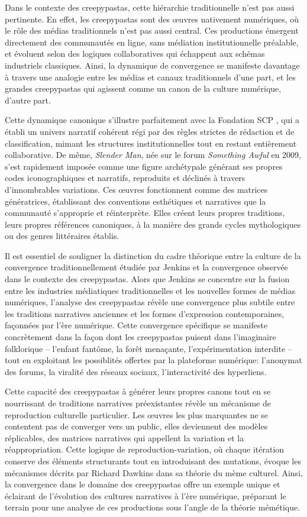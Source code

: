 \documentclass[12pt,a4paper,oneside,titlepage]{book} %
\begin{document}
Dans le contexte des creepypastas, cette hiérarchie traditionnelle n'est pas aussi pertinente. En effet, les creepypastas sont des œuvres nativement numériques, où le rôle des médias traditionnels n'est pas aussi central. Ces productions émergent directement des communautés en ligne, sans médiation institutionnelle préalable, et évoluent selon des logiques collaboratives qui échappent aux schémas industriels classiques. Ainsi, la dynamique de convergence se manifeste davantage à travers une analogie entre les médias et canaux traditionnels d'une part, et les grandes creepypastas qui agissent comme un canon de la culture numérique, d'autre part.

Cette dynamique canonique s'illustre parfaitement avec la Fondation SCP , qui a établi un univers narratif cohérent régi par des règles strictes de rédaction et de classification, mimant les structures institutionnelles tout en restant entièrement collaborative. De même, \textit{Slender Man}, née sur le forum \textit{Something Awful }en 2009, s'est rapidement imposée comme une figure archétypale générant ses propres codes iconographiques et narratifs, reproduits et déclinés à travers d'innombrables variations. Ces œuvres fonctionnent comme des matrices génératrices, établissant des conventions esthétiques et narratives que la communauté s'approprie et réinterprète. Elles créent leurs propres traditions, leurs propres références canoniques, à la manière des grands cycles mythologiques ou des genres littéraires établis.

Il est essentiel de souligner la distinction du cadre théorique entre la culture de la convergence traditionnellement étudiée par Jenkins et la convergence observée dans le contexte des creepypastas. Alors que Jenkins se concentre sur la fusion entre les industries médiatiques traditionnelles et les nouvelles formes de médias numériques, l'analyse des creepypastas révèle une convergence plus subtile entre les traditions narratives anciennes et les formes d'expression contemporaines, façonnées par l'ère numérique. Cette convergence spécifique se manifeste concrètement dans la façon dont les creepypastas puisent dans l'imaginaire folklorique – l'enfant fantôme, la forêt menaçante, l'expérimentation interdite – tout en exploitant les possiblités offertes par la plateforme numérique: l'anonymat des forums, la viralité des réseaux sociaux, l'interactivité des hyperliens.

Cette capacité des creepypastas à générer leurs propres canons tout en se nourrissant de traditions narratives préexistantes révèle un mécanisme de reproduction culturelle particulier. Les œuvres les plus marquantes ne se contentent pas de converger vers un public, elles deviennent des modèles réplicables, des matrices narratives qui appellent la variation et la réappropriation. Cette logique de reproduction-variation, où chaque itération conserve des éléments structurants tout en introduisant des mutations, évoque les mécanismes décrits par Richard Dawkins dans sa théorie du mème culturel. Ainsi, la convergence dans le domaine des creepypastas offre un exemple unique et éclairant de l'évolution des cultures narratives à l'ère numérique, préparant le terrain pour une analyse de ces productions sous l'angle de la théorie mémétique.
\end{document}
